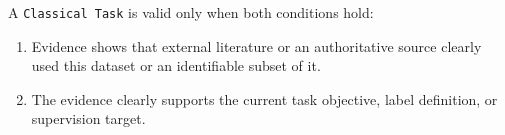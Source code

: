 \begin{tcolorbox}
\noindent A \texttt{Classical Task} is valid only when both conditions hold:\par\smallskip

\begin{enumerate}[leftmargin=1.5em,noitemsep,topsep=2pt]
\item Evidence shows that external literature or an authoritative source clearly used this dataset or an identifiable subset of it.
\item The evidence clearly supports the current task objective, label definition, or supervision target.
\end{enumerate}

\smallskip{}\par\smallskip


\end{tcolorbox}

